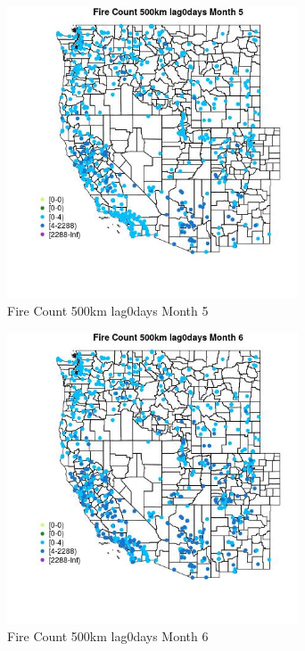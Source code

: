 \begin{figure} 
\centering  
\includegraphics[width=0.77\textwidth]{Code_Outputs/Report_ML_input_PM25_Step4_part_e_de_duplicated_aves_compiled_2019-05-21wNAs_MapObsMo5Fire_Count_500km_lag0days.jpg} 
\caption{\label{fig:Report_ML_input_PM25_Step4_part_e_de_duplicated_aves_compiled_2019-05-21wNAsMapObsMo5Fire_Count_500km_lag0days}Fire Count 500km lag0days Month 5} 
\end{figure} 
 

\begin{figure} 
\centering  
\includegraphics[width=0.77\textwidth]{Code_Outputs/Report_ML_input_PM25_Step4_part_e_de_duplicated_aves_compiled_2019-05-21wNAs_MapObsMo6Fire_Count_500km_lag0days.jpg} 
\caption{\label{fig:Report_ML_input_PM25_Step4_part_e_de_duplicated_aves_compiled_2019-05-21wNAsMapObsMo6Fire_Count_500km_lag0days}Fire Count 500km lag0days Month 6} 
\end{figure} 
 

